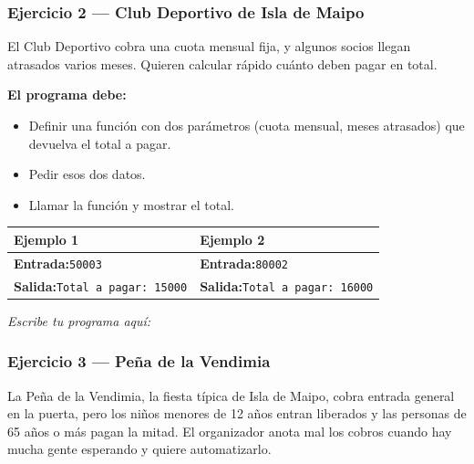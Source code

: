 \documentclass[11pt]{article}
\begin{document}
\begin{cajaescribe}[height=4.5cm]
\end{cajaescribe}

\subsubsection*{Ejercicio 2 --- Club Deportivo de Isla de Maipo}
El Club Deportivo cobra una cuota mensual fija, y algunos socios llegan atrasados varios meses. Quieren calcular rápido cuánto deben pagar en total.

\textbf{El programa debe:}
\begin{itemize}
  \item Definir una función con dos parámetros (cuota mensual, meses atrasados) que devuelva el total a pagar.
  \item Pedir esos dos datos.
  \item Llamar la función y mostrar el total.
\end{itemize}
\vspace{1mm}
\noindent\begin{tabularx}{\linewidth}{|X|X|}
\hline
\textbf{Ejemplo 1} & \textbf{Ejemplo 2} \\
\hline
\textbf{Entrada:}\newline \texttt{5000}\newline \texttt{3} & \textbf{Entrada:}\newline \texttt{8000}\newline \texttt{2} \\
\hline
\textbf{Salida:}\newline \texttt{Total a pagar: 15000} & \textbf{Salida:}\newline \texttt{Total a pagar: 16000} \\
\hline
\end{tabularx}
\vspace{1mm}
\vspace{2mm}\textit{Escribe tu programa aquí:}\vspace{1mm}

\begin{cajaescribe}[height=4.5cm]
\end{cajaescribe}

\subsubsection*{Ejercicio 3 --- Peña de la Vendimia}
La Peña de la Vendimia, la fiesta típica de Isla de Maipo, cobra entrada general en la puerta, pero los niños menores de 12 años entran liberados y las personas de 65 años o más pagan la mitad. El organizador anota mal los cobros cuando hay mucha gente esperando y quiere automatizarlo.
\end{document}
